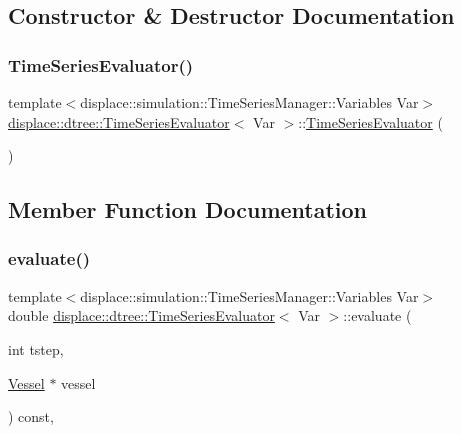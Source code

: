\subsection{Constructor \& Destructor Documentation}
\mbox{\label{classdisplace_1_1dtree_1_1_time_series_evaluator_a148e9dd081b0cafa5d576c20dca37a53}} 
\subsubsection{\texorpdfstring{TimeSeriesEvaluator()}{TimeSeriesEvaluator()}}
{\footnotesize\ttfamily template$<$displace\+::simulation\+::\+Time\+Series\+Manager\+::\+Variables Var$>$ \\
\mbox{\hyperlink{classdisplace_1_1dtree_1_1_time_series_evaluator}{displace\+::dtree\+::\+Time\+Series\+Evaluator}}$<$ Var $>$\+::\mbox{\hyperlink{classdisplace_1_1dtree_1_1_time_series_evaluator}{Time\+Series\+Evaluator}} (\begin{DoxyParamCaption}{ }\end{DoxyParamCaption})\hspace{0.3cm}{\ttfamily [inline]}}



\subsection{Member Function Documentation}
\mbox{\label{classdisplace_1_1dtree_1_1_time_series_evaluator_aca42c6a8684a9bc24d335817d6742f84}} 
\subsubsection{\texorpdfstring{evaluate()}{evaluate()}}
{\footnotesize\ttfamily template$<$displace\+::simulation\+::\+Time\+Series\+Manager\+::\+Variables Var$>$ \\
double \mbox{\hyperlink{classdisplace_1_1dtree_1_1_time_series_evaluator}{displace\+::dtree\+::\+Time\+Series\+Evaluator}}$<$ Var $>$\+::evaluate (\begin{DoxyParamCaption}\item[{int}]{tstep,  }\item[{\mbox{\hyperlink{class_vessel}{Vessel}} $\ast$}]{vessel }\end{DoxyParamCaption}) const\hspace{0.3cm}{\ttfamily [inline]}, {\ttfamily [virtual]}}



